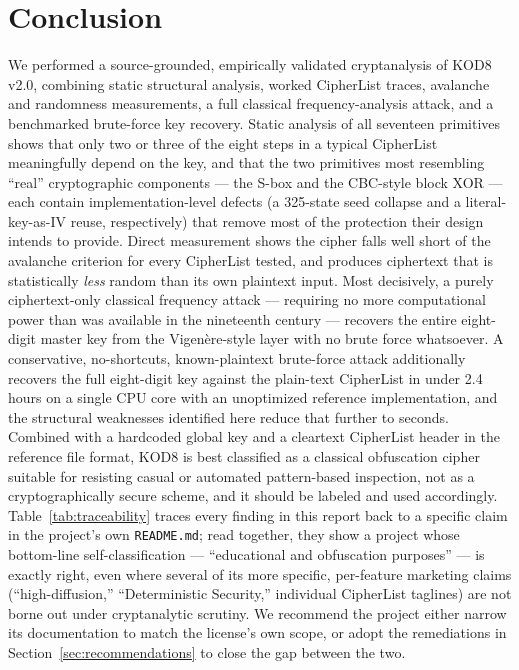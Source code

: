 \documentclass[11pt]{article}
\begin{document}
\section{Conclusion}

We performed a source-grounded, empirically validated cryptanalysis of
KOD8 v2.0, combining static structural analysis, worked CipherList
traces, avalanche and randomness measurements, a full classical
frequency-analysis attack, and a benchmarked brute-force key recovery.
Static analysis of all seventeen primitives shows that only two or
three of the eight steps in a typical CipherList meaningfully depend on
the key, and that the two primitives most resembling ``real''
cryptographic components --- the S-box and the CBC-style block XOR ---
each contain implementation-level defects (a 325-state seed collapse and
a literal-key-as-IV reuse, respectively) that remove most of the
protection their design intends to provide. Direct measurement shows
the cipher falls well short of the avalanche criterion for every
CipherList tested, and produces ciphertext that is statistically
\emph{less} random than its own plaintext input. Most decisively, a
purely ciphertext-only classical frequency attack --- requiring no more
computational power than was available in the nineteenth century ---
recovers the entire eight-digit master key from the Vigen\`ere-style
layer with no brute force whatsoever. A conservative, no-shortcuts,
known-plaintext brute-force attack additionally recovers the full
eight-digit key against the plain-text CipherList in under 2.4 hours on
a single CPU core with an unoptimized reference implementation, and the
structural weaknesses identified here reduce that further to seconds.
Combined with a hardcoded global key and a cleartext CipherList header
in the reference file format, KOD8 is best classified as a classical
obfuscation cipher suitable for resisting casual or automated
pattern-based inspection, not as a cryptographically secure scheme, and
it should be labeled and used accordingly. Table~\ref{tab:traceability}
traces every finding in this report back to a specific claim in the
project's own \texttt{README.md}; read together, they show a project
whose bottom-line self-classification --- ``educational and obfuscation
purposes'' --- is exactly right, even where several of its more specific,
per-feature marketing claims (``high-diffusion,'' ``Deterministic
Security,'' individual CipherList taglines) are not borne out under
cryptanalytic scrutiny. We recommend the project either narrow its
documentation to match the license's own scope, or adopt the
remediations in Section~\ref{sec:recommendations} to close the gap
between the two.
\end{document}
